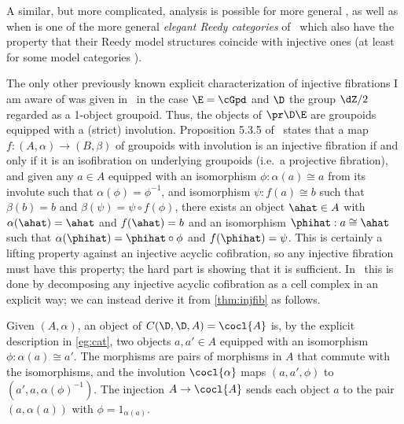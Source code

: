 \begin{verbose}
\begin{eg}
  A similar, but more complicated, analysis is possible for more general \E, as well as when \D is one of the more general \emph{elegant Reedy categories} of~\cite{br:reedy} which also have the property that their Reedy model structures coincide with injective ones (at least for some model categories \E).
\end{eg}

\begin{eg}
  The only other previously known explicit characterization of injective fibrations I am aware of was given in~\cite{bordg:thesis} in the case $\E=\cGpd$ and $\D$ the group $\dZ/2$ regarded as a 1-object groupoid.
  Thus, the objects of $\pr\D\E$ are groupoids equipped with a (strict) involution.
  Proposition 5.3.5 of~\cite{bordg:thesis} states that a map $f:(A,\alpha)\to (B,\beta)$ of groupoids with involution is an injective fibration if and only if it is an isofibration on underlying groupoids (i.e.\ a projective fibration), and given any $a\in A$ equipped with an isomorphism $\phi : \alpha(a) \cong a$ from its involute such that $\alpha(\phi) = \phi^{-1}$, and isomorphism $\psi : f(a) \cong b$ such that $\beta(b) = b$ and $\beta(\psi) = \psi\circ f(\phi)$, there exists an object $\ahat\in A$ with $\alpha(\ahat)=\ahat$ and $f(\ahat) = b$ and an isomorphism $\phihat:a\cong \ahat$ such that $\alpha(\phihat) = \phihat\circ \phi$ and $f(\phihat)=\psi$.
  This is certainly a lifting property against an injective acyclic cofibration, so any injective fibration must have this property; the hard part is showing that it is sufficient.
  In~\cite{bordg:thesis} this is done by decomposing any injective acyclic cofibration as a cell complex in an explicit way; we can instead derive it from \cref{thm:injfib} as follows.

  Given $(A,\alpha)$, an object of $C(\D,\D,A) = \cocl{A}$ is, by the explicit description in \cref{eg:cat}, two objects $a,a'\in A$ equipped with an isomorphism $\phi : \alpha(a) \cong a'$.
  The morphisms are pairs of morphisms in $A$ that commute with the isomorphisms, and the involution $\cocl{\alpha}$ maps $(a,a',\phi)$ to $(a',a,\alpha(\phi)^{-1})$.
  The injection $A\to \cocl{A}$ sends each object $a$ to the pair $(a,\alpha(a))$ with $\phi = 1_{\alpha(a)}$.


\end{eg}
\end{verbose}
